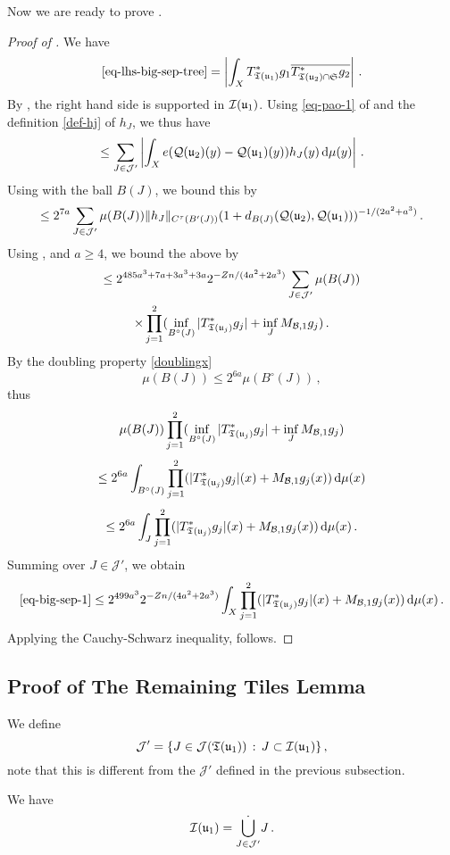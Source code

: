     Now we are ready to prove .
    \begin{proof}[Proof of ]
    \leanok
    We have
    $$
        \eqref{eq-lhs-big-sep-tree} = \left| \int_{X} T_{{\mathfrak T}({\mathfrak u}_1)}^* g_1 \overline{T_{{\mathfrak T}({\mathfrak u}_2) \cap \mathfrak{S}}^* g_2 }\right|\,.
    $$
    By , the right hand side is supported in ${\mathcal{I}}({\mathfrak u}_1)$. Using \eqref{eq-pao-1} of  and the definition \eqref{def-hj} of $h_J$, we thus have
    $$
        \le \sum_{J \in \mathcal{J}'} \left|\int_{X} e({\mathcal{Q}}({\mathfrak u}_2)(y) - {\mathcal{Q}}({\mathfrak u}_1)(y)) h_J(y) \, \mathrm{d}\mu(y) \right|\,.
    $$
    Using  with the ball $B(J)$, we bound this by
    $$
        \le 2^{7a} \sum_{J \in \mathcal{J}'} \mu(B(J)) \|h_J\|_{C^{\tau}(B'(J))} (1 + d_{B(J)}({\mathcal{Q}}({\mathfrak u}_2), {\mathcal{Q}}({\mathfrak u}_1)))^{-1/(2a^2+a^3)}\,.
    $$
    Using ,  and $a \ge 4$, we bound the above by
    \begin{multline}
        \label{eq-big-sep-1}
        \le 2^{485a^3+7a+3a^3+3a} 2^{-Zn/(4a^2 + 2a^3)} \sum_{J \in \mathcal{J}'} \mu(B(J)) \\
        \times \prod_{j=1}^2 (\inf_{B^\circ{}(J)} |T_{{\mathfrak T}({\mathfrak u}_j)}^* g_j| + \inf_J M_{\mathcal{B},1} g_j)\,.
    \end{multline}
    By the doubling property \eqref{doublingx}
    $$
        \mu(B(J)) \le 2^{6a} \mu(B^\circ{}(J))\,,
    $$
    thus
    $$
        \mu(B(J)) \prod_{j=1}^2 (\inf_{B^\circ{}(J)} |T_{{\mathfrak T}({\mathfrak u}_j)}^* g_j| + \inf_J M_{\mathcal{B},1} g_j)
    $$
    $$
        \le 2^{6a} \int_{B^\circ{}(J)} \prod_{j=1}^2 ( |T_{{\mathfrak T}({\mathfrak u}_j)}^* g_j|(x) + M_{\mathcal{B},1} g_j(x)) \, \mathrm{d}\mu(x)
    $$
    $$
        \le 2^{6a} \int_J \prod_{j=1}^2 ( |T_{{\mathfrak T}({\mathfrak u}_j)}^* g_j|(x) + M_{\mathcal{B},1} g_j(x)) \, \mathrm{d}\mu(x)\,.
    $$
    Summing over $J \in \mathcal{J}'$, we obtain
    $$
        \eqref{eq-big-sep-1} \le 2^{499a^3} 2^{-Zn/(4a^2 + 2a^3)} \int_X \prod_{j=1}^2 ( |T_{{\mathfrak T}({\mathfrak u}_j)}^* g_j|(x) + M_{\mathcal{B},1} g_j(x)) \, \mathrm{d}\mu(x)\,.
    $$
    Applying the Cauchy-Schwarz inequality,  follows.
    \end{proof}

\subsection{Proof of The Remaining Tiles Lemma}
    \label{subsec-rest-tiles}
    We define
    $$
        \mathcal{J}' = \{J \in \mathcal{J}({\mathfrak T}({\mathfrak u}_1)) \, : \, J \subset {\mathcal{I}}({\mathfrak u}_1)\}\,,
    $$
    note that this is different from the $\mathcal{J}'$ defined in the previous subsection.
    \begin{lemma}
        \label{dyadic-partition-2}
        \leanok
        We have
        $$
            {\mathcal{I}}({\mathfrak u}_1) = \dot{\bigcup_{J \in \mathcal{J}'}} J\,.
        $$
    \end{lemma}


